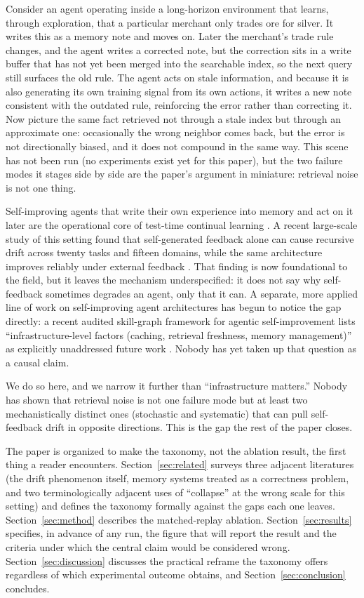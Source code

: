 \documentclass{article}
\begin{document}
Consider an agent operating inside a long-horizon environment that learns, through exploration, that a particular merchant only trades ore for silver. It writes this as a memory note and moves on. Later the merchant's trade rule changes, and the agent writes a corrected note, but the correction sits in a write buffer that has not yet been merged into the searchable index, so the next query still surfaces the old rule. The agent acts on stale information, and because it is also generating its own training signal from its own actions, it writes a new note consistent with the outdated rule, reinforcing the error rather than correcting it. Now picture the same fact retrieved not through a stale index but through an approximate one: occasionally the wrong neighbor comes back, but the error is not directionally biased, and it does not compound in the same way. This scene has not been run (no experiments exist yet for this paper), but the two failure modes it stages side by side are the paper's argument in miniature: retrieval noise is not one thing.

Self-improving agents that write their own experience into memory and act on it later are the operational core of test-time continual learning \citep{skillearnbench2026}. A recent large-scale study of this setting found that self-generated feedback alone can cause recursive drift across twenty tasks and fifteen domains, while the same architecture improves reliably under external feedback \citep{skillearnbench2026}. That finding is now foundational to the field, but it leaves the mechanism underspecified: it does not say why self-feedback sometimes degrades an agent, only that it can. A separate, more applied line of work on self-improving agent architectures has begun to notice the gap directly: a recent audited skill-graph framework for agentic self-improvement lists ``infrastructure-level factors (caching, retrieval freshness, memory management)'' as explicitly unaddressed future work \citep{auditedskillgraph2026}. Nobody has yet taken up that question as a causal claim.

We do so here, and we narrow it further than ``infrastructure matters.'' Nobody has shown that retrieval noise is not one failure mode but at least two mechanistically distinct ones (stochastic and systematic) that can pull self-feedback drift in opposite directions. This is the gap the rest of the paper closes.

The paper is organized to make the taxonomy, not the ablation result, the first thing a reader encounters. Section~\ref{sec:related} surveys three adjacent literatures (the drift phenomenon itself, memory systems treated as a correctness problem, and two terminologically adjacent uses of ``collapse'' at the wrong scale for this setting) and defines the taxonomy formally against the gaps each one leaves. Section~\ref{sec:method} describes the matched-replay ablation. Section~\ref{sec:results} specifies, in advance of any run, the figure that will report the result and the criteria under which the central claim would be considered wrong. Section~\ref{sec:discussion} discusses the practical reframe the taxonomy offers regardless of which experimental outcome obtains, and Section~\ref{sec:conclusion} concludes.
\end{document}
